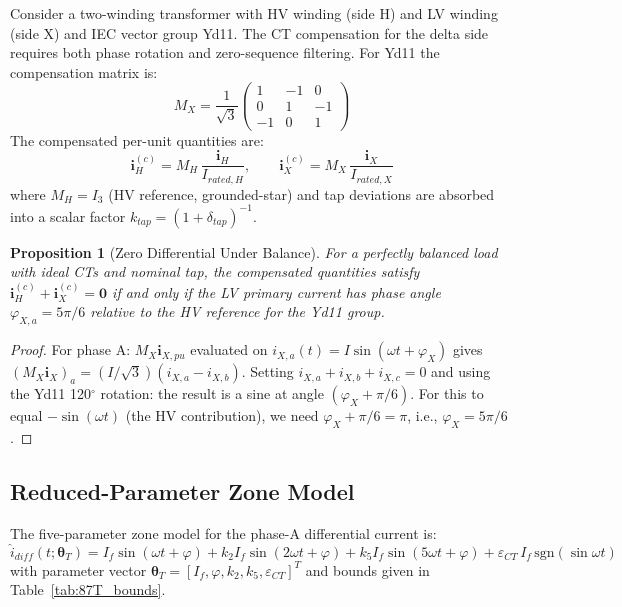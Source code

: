 \documentclass[12pt,a4paper]{article}
\newtheorem{proposition}[theorem]{Proposition}
\newcommand{\thetaT}{\boldsymbol{\theta}_T}
\begin{document}
Consider a two-winding transformer with HV winding (side H) and LV winding
(side X) and IEC vector group Yd11.  The CT compensation for the delta side
requires both phase rotation and zero-sequence filtering.  For Yd11 the
compensation matrix is:
\begin{equation}
  M_X = \frac{1}{\sqrt{3}}
  \begin{pmatrix}
    1 & -1 & 0 \\
    0 &  1 & -1 \\
   -1 &  0 &  1
  \end{pmatrix}
  \label{eq:MX}
\end{equation}
The compensated per-unit quantities are:
\begin{equation}
  \bm{i}_H^{(c)} = M_H\,\frac{\bm{i}_H}{I_{rated,H}},
  \qquad
  \bm{i}_X^{(c)} = M_X\,\frac{\bm{i}_X}{I_{rated,X}}
  \label{eq:comp}
\end{equation}
where $M_H = I_3$ (HV reference, grounded-star) and tap deviations are
absorbed into a scalar factor $k_{tap} = (1 + \delta_{tap})^{-1}$.

\begin{proposition}[Zero Differential Under Balance]
\label{prop:zero_diff}
For a perfectly balanced load with ideal CTs and nominal tap, the compensated
quantities satisfy $\bm{i}_H^{(c)} + \bm{i}_X^{(c)} = \bm{0}$ if and only if
the LV primary current has phase angle $\varphi_{X,a} = 5\pi/6$ relative to
the HV reference for the Yd11 group.
\end{proposition}

\begin{proof}
For phase A: $M_X \bm{i}_{X,pu}$ evaluated on
$i_{X,a}(t) = I\sin(\omega t + \varphi_X)$ gives
$(M_X \bm{i}_X)_a = (I/\sqrt{3})(i_{X,a} - i_{X,b})$.
Setting $i_{X,a}+i_{X,b}+i_{X,c}=0$ and using the Yd11 120$^\circ$ rotation:
the result is a sine at angle $(\varphi_X + \pi/6)$.  For this to equal
$-\sin(\omega t)$ (the HV contribution), we need $\varphi_X + \pi/6 = \pi$,
i.e., $\varphi_X = 5\pi/6$.
\end{proof}

\subsection{Reduced-Parameter Zone Model}
\label{sec:87T_model}

The five-parameter zone model for the phase-A differential current is:
\begin{equation}
  \hat{i}_{diff}(t;\thetaT) =
    I_f \sin(\omega t + \varphi)
  + k_2 I_f \sin(2\omega t + \varphi)
  + k_5 I_f \sin(5\omega t + \varphi)
  + \varepsilon_{CT}\, I_f \,\mathrm{sgn}(\sin\omega t)
  \label{eq:87T_model}
\end{equation}
with parameter vector $\thetaT = [I_f, \varphi, k_2, k_5, \varepsilon_{CT}]^T$
and bounds given in Table~\ref{tab:87T_bounds}.
\end{document}
